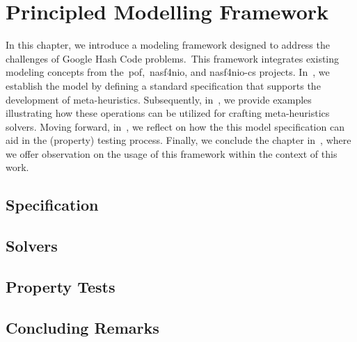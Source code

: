 \chapter{Principled Modelling Framework}
\label{ch:principled-modelling-framework}


In this chapter, we introduce a modeling framework designed to address the
challenges of Google Hash Code problems.~This framework integrates existing
modeling concepts from the~\acrshort{pof},~\acrshort{nasf4nio}, and
\acrshort{nasf4nio-cs} projects. In~, we establish the
model by defining a standard specification that supports the development of
meta-heuristics. Subsequently, in~, we provide examples
illustrating how these operations can be utilized for crafting meta-heuristics
solvers. Moving forward, in~, we reflect on how the this model
specification can aid in the (property) testing process. Finally, we conclude
the chapter in~, where we offer observation on
the usage of this framework within the context of this work.

\section{Specification}
\label{sec:specification}


\section{Solvers}
\label{sec:solver}


\section{Property Tests}
\label{sec:tests}


\section{Concluding Remarks}
\label{sec:pmf-concluding-remarks}

